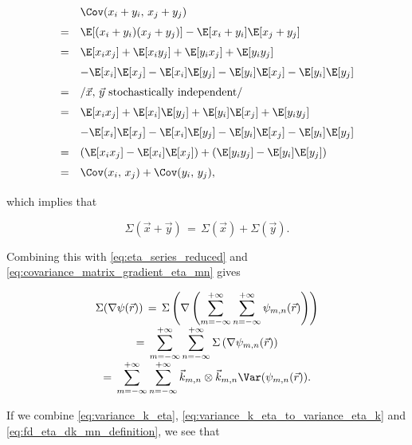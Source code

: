 \begin{equation}
\renewcommand*{\arraystretch}{1.5}
\begin{array}{cl}
  & \Cov(x_i+y_i,\,x_j+y_j) \\
= & \E[(x_i+y_i)(x_j+y_j)] - \E[x_i+y_i]\E[x_j+y_j] \\
= & \E[x_i x_j] + \E[x_i y_j] + \E[y_i x_j] + \E[y_i y_j] \\
  & - \E[x_i]\E[x_j] - \E[x_i]\E[y_j] - \E[y_i]\E[x_j] - \E[y_i]\E[y_j] \\
= & \left/ \vec{x},\, \vec{y}\ \text{stochastically independent}\right/ \\
= & \E[x_i x_j] + \E[x_i]\E[y_j] + \E[y_i]\E[x_j] + \E[y_i y_j] \\
  & - \E[x_i]\E[x_j] - \E[x_i]\E[y_j] - \E[y_i]\E[x_j] - \E[y_i]\E[y_j] \\
= & (\E[x_i x_j] - \E[x_i]\E[x_j]) + (\E[y_i y_j] - \E[y_i]\E[y_j]) \\
= & \Cov(x_i,\,x_j) + \Cov(y_i,\,y_j),
\end{array}
\end{equation}

which implies that

\begin{equation} \label{eq:covariance_matrix_sum}
\Sigma(\vec{x} + \vec{y}) \,=\, \Sigma(\vec{x}) + \Sigma(\vec{y}).
\end{equation}

Combining this with \eqref{eq:eta_series_reduced} and \eqref{eq:covariance_matrix_gradient_eta_mn} gives

\begin{equation} \label{eq:covariance_matrix_gradient_eta}
\renewcommand*{\arraystretch}{2}
\begin{array}{c}
\displaystyle \Sigma(\nabla\psi(\vec{r})) \,=\, \Sigma\left(\nabla\left(\sum_{m=-\infty}^{+\infty}\sum_{n=-\infty}^{+\infty} \psi_{m,n}(\vec{r})\right)\right) \\
\displaystyle =\, \sum_{m=-\infty}^{+\infty}\sum_{n=-\infty}^{+\infty}\Sigma\left(\nabla\psi_{m,n}(\vec{r})\right) \\ \displaystyle =\, \sum_{m=-\infty}^{+\infty}\sum_{n=-\infty}^{+\infty}\vec{k}_{m,n}\otimes\vec{k}_{m,n} \Var(\psi_{m,n}(\vec{r})).
\end{array}
\end{equation}

If we combine \eqref{eq:variance_k_eta}, \eqref{eq:variance_k_eta_to_variance_eta_k} and \eqref{eq:fd_eta_dk_mn_definition}, we see that

